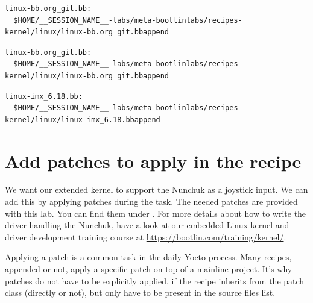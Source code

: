 \if{}
\begin{verbatim}
linux-bb.org_git.bb:
  $HOME/__SESSION_NAME__-labs/meta-bootlinlabs/recipes-kernel/linux/linux-bb.org_git.bbappend
\end{verbatim}
\fi

\if{}
\begin{verbatim}
linux-bb.org_git.bb:
  $HOME/__SESSION_NAME__-labs/meta-bootlinlabs/recipes-kernel/linux/linux-bb.org_git.bbappend
\end{verbatim}
\fi

\if{}
\begin{verbatim}
linux-imx_6.18.bb:
  $HOME/__SESSION_NAME__-labs/meta-bootlinlabs/recipes-kernel/linux/linux-imx_6.18.bbappend
\end{verbatim}
\fi

\section{Add patches to apply in the recipe}

We want our extended {\tt \linuxrecipename{}} kernel to support the Nunchuk as
a joystick input. We can add this by applying patches during the
 task. The needed patches are provided with this lab. You can
find them under . For more
details about how to write the driver handling the Nunchuk, have a look at our
embedded Linux kernel and driver development training course at
\url{https://bootlin.com/training/kernel/}.

Applying a patch is a common task in the daily Yocto process. Many recipes,
appended or not, apply a specific patch on top of a mainline project. It's why
patches do not have to be explicitly applied, if the recipe inherits from the
patch class (directly or not), but only have to be present in the source files
list.

